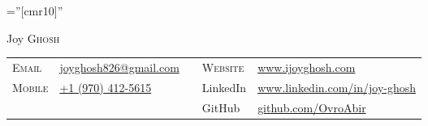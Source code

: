 \documentclass[letterpaper,10pt]{article}
\begin{document}
\vspace{-\baselineskip}
\pagestyle{empty} %

\font\fb=''[cmr10]'' %

\par{\centering
    {\Huge Joy \textsc{Ghosh}
  }\par}

\begin{tabular}{p{1.5cm}p{5cm}p{5cm}p{1.5cm}p{5cm}}
     \textsc{Email} & \href{mailto:joyghosh826@gmail.com}{joyghosh826@gmail.com}
     & & 
     \textsc{Website} & \href{www.ijoyghosh.com}{www.ijoyghosh.com} \\
     \textsc{Mobile} & \href{tel:+19704125615}{+1 (970) 412-5615} & & LinkedIn & \href{https://www.linkedin.com/in/joy-ghosh}{www.linkedin.com/in/joy-ghosh} \\
     & & & GitHub & \href{https://github.com/OvroAbir}{github.com/OvroAbir}
\end{tabular}



\end{document}
